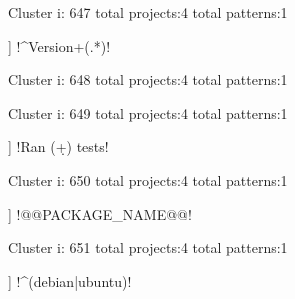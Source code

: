 Cluster i: 647
total projects:4
total patterns:1
\begin{multicols}{1}
\begin{description}[noitemsep,topsep=0pt]
\item [[4] ] \cverb!^Version\s+(.*)!
\end{description}
\end{multicols}







Cluster i: 648
total projects:4
total patterns:1
\begin{multicols}{1}
\begin{description}[noitemsep,topsep=0pt]
\item [[4] ] \cverb!\[[a-zA-Z0-9.]:!
\end{description}
\end{multicols}







Cluster i: 649
total projects:4
total patterns:1
\begin{multicols}{1}
\begin{description}[noitemsep,topsep=0pt]
\item [[4] ] \cverb!Ran (\d+) tests!
\end{description}
\end{multicols}







Cluster i: 650
total projects:4
total patterns:1
\begin{multicols}{1}
\begin{description}[noitemsep,topsep=0pt]
\item [[4] ] \cverb!@@PACKAGE_NAME@@!
\end{description}
\end{multicols}







Cluster i: 651
total projects:4
total patterns:1
\begin{multicols}{1}
\begin{description}[noitemsep,topsep=0pt]
\item [[4] ] \cverb!^(debian|ubuntu)!
\end{description}
\end{multicols}







